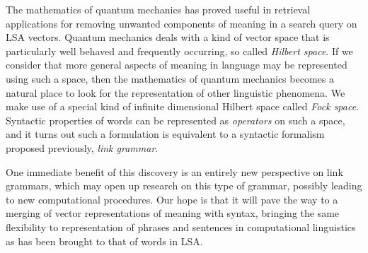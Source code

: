 \documentclass[12pt]{report}
\begin{document}

The mathematics of quantum mechanics has proved useful in retrieval applications for removing unwanted components of meaning in a search query \cite{Widdows:03} on LSA vectors.
Quantum mechanics deals with a kind of vector space that is particularly well behaved and frequently occurring, so called \emph{Hilbert space}. If we consider that more general aspects of meaning in language may be represented using such a space, then the mathematics of quantum mechanics becomes a natural place to look for the representation of other linguistic phenomena. We make use of a special kind of infinite dimensional Hilbert space called \emph{Fock space}. Syntactic properties of words can be represented as \emph{operators} on such a space, and it turns out such a formulation is equivalent to a syntactic formalism proposed previously, \emph{link grammar}.

One immediate benefit of this discovery is an entirely new perspective on link grammars, which may open up research on this type of grammar, possibly leading to new computational procedures. Our hope is that it will pave the way to a merging of vector representations of meaning with syntax, bringing the same flexibility to representation of phrases and sentences in computational linguistics as has been brought to that of words in LSA.
\end{document}
